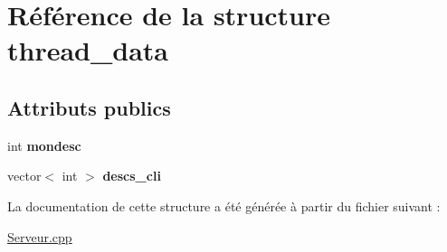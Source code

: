 \hypertarget{structthread__data}{\section{Référence de la structure thread\-\_\-data}
\label{structthread__data}
}
\subsection*{Attributs publics}
\begin{DoxyCompactItemize}
\item 
\hypertarget{structthread__data_aa2a4c9277a3ef6de228eba6e78dbc4ab}{int {\bfseries mondesc}}\label{structthread__data_aa2a4c9277a3ef6de228eba6e78dbc4ab}

\item 
\hypertarget{structthread__data_a6f8927f7ea34989e2d8d0dfa870a0738}{vector$<$ int $>$ {\bfseries descs\-\_\-cli}}\label{structthread__data_a6f8927f7ea34989e2d8d0dfa870a0738}

\end{DoxyCompactItemize}


La documentation de cette structure a été générée à partir du fichier suivant \-:\begin{DoxyCompactItemize}
\item 
\hyperlink{_serveur_8cpp}{Serveur.\-cpp}\end{DoxyCompactItemize}
